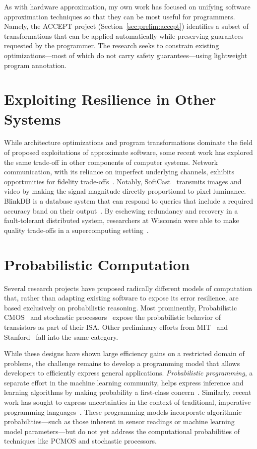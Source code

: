 As with hardware approximation, my own work has focused on unifying software
approximation techniques so that they can be most useful for programmers.
Namely, the ACCEPT project (Section~\ref{sec:prelim:accept}) identifies a
subset of transformations that can be applied automatically while preserving
guarantees requested by the programmer. The research seeks to constrain
existing optimizations---most of which do not carry safety guarantees---using
lightweight program annotation.


\section{Exploiting Resilience in Other Systems}

While architecture optimizations and program transformations dominate the
field of proposed exploitations of approximate software, some recent work has
explored the same trade-off in other components of computer systems. Network
communication, with its reliance on imperfect underlying channels, exhibits
opportunities for fidelity trade-offs~\cite{softcast, luo-globecom, apex,
smpmup2006}. Notably, SoftCast~\cite{softcast} transmits images and video by
making the signal magnitude directly proportional to pixel luminance. BlinkDB
is a database system that can respond to queries that include a required
accuracy band on their output~\cite{blinkdb}. By eschewing redundancy and
recovery in a fault-tolerant distributed system, researchers at Wisconsin were
able to make quality trade-offs in a supercomputing
setting~\cite{dekruijf-icpp}.


\section{Probabilistic Computation}

Several research projects have proposed radically different models of
computation that, rather than adapting existing software to expose its error
resilience, are based exclusively on probabilistic reasoning. Most
prominently, Probabilistic CMOS~\cite{pcmos, pcmos-cacm, palem-dac-position}
and stochastic processors~\cite{stochasticproc} expose the probabilistic
behavior of transistors as part of their ISA.
Other preliminary efforts from MIT~\cite{batesmit, lyric, mansinghka-circuits} and
Stanford~\cite{ersa} fall into the same category.

While these designs have shown large efficiency gains on a restricted domain
of problems, the challenge remains to develop a programming model that allows
developers to efficiently express general applications. \emph{Probabilistic
programming}, a separate effort in the machine learning community, helps
express inference and learning algorithms by making probability a first-class
concern~\cite{church}. Similarly, recent work has sought to express
uncertainties in the context of traditional, imperative programming
languages~\cite{uncertaint}. These programming models incorporate algorithmic
probabilities---such as those inherent in sensor readings or machine learning
model parameters---but do not yet address the computational probabilities of
techniques like PCMOS and stochastic processors.

